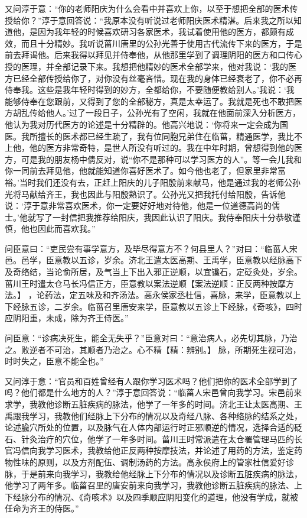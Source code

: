 \documentclass[12pt,UTF8]{ctexbook}
\begin{document}
又问淳于意：“你的老师阳庆为什么会看中并喜欢上你，以至于想把全部的医术传授给你？”淳于意回答说：“我原本没有听说过老师阳庆医术精湛。后来我之所以知道他，是因为我年轻的时候喜欢研习各家医术，我试着使用他的医方，都颇有成效，而且十分精妙。我听说菑川唐里的公孙光善于使用古代流传下来的医方，于是前去拜谒他。后来我得以拜见并侍奉他，从他那里学到了调理阴阳的医方和口传心授的医理，并全部记录下来。我想把他精妙的医术全部学来，他对我说：‘我的医方已经全部传授给你了，对你没有丝毫吝惜。现在我的身体已经衰老了，你不必再侍奉我。这些是我年轻时得到的妙方，全都给你，不要随便教给别人。’我说：‘我能够侍奉在您跟前，又得到了您的全部秘方，真是太幸运了。我就是死也不敢把医方胡乱传给他人。’过了一段日子，公孙光有了空闲，我就在他面前深入分析医方，他认为我对历代医方的论述是十分精辟的。他高兴地说：‘你将来一定会成为国医。我所擅长的医术都已经生疏了，我有位同胞兄弟住在临菑，精通医学，我比不上他，他的医方非常奇特，是世人所没有听过的。我在中年时期，曾想得到他的医方，可是我的朋友杨中倩反对，说“你不是那种可以学习医方的人”。等一会儿我和你一同前去拜见他，他就能知道你喜好医术了。如今他也老了，但家里非常富裕。’当时我们还没有去，正赶上阳庆的儿子阳殷前来献马，他是通过我的老师公孙光将马献给齐王，我也因此与阳殷熟识了。公孙光又把我托付给阳殷，告诉他说：‘淳于意非常喜欢医术，你一定要好好地对待他，他是一位道德高尚的儒士。’他就写了一封信把我推荐给阳庆，我因此认识了阳庆。我侍奉阳庆十分恭敬谨慎，他也因此而喜欢我。”

问臣意曰：“吏民尝有事学意方，及毕尽得意方不？何县里人？”对曰：“临菑人宋邑。邑学，臣意教以五诊，岁余。济北王遣太医高期、王禹学，臣意教以经脉高下及奇络结，当论俞所居，及气当上下出入邪正逆顺，以宜镵石，定砭灸处，岁余。菑川王时遣太仓马长冯信正方，臣意教以案法逆顺【案法逆顺：正反两种按摩方法。】 ，论药法，定五味及和齐汤法。高永侯家丞杜信，喜脉，来学，臣意教以上下经脉五诊，二岁余。临菑召里唐安来学，臣意教以五诊上下经脉，《奇咳》，四时应阴阳重，未成，除为齐王侍医。”

问臣意：“诊病决死生，能全无失乎？”臣意对曰：“意治病人，必先切其脉，乃治之。败逆者不可治，其顺者乃治之。心不精【精：辨别。】 脉，所期死生视可治，时时失之，臣意不能全也。”

又问淳于意：“官员和百姓曾经有人跟你学习医术吗？他们把你的医术全部学到了吗？他们都是什么地方的人？”淳于意回答说：“临菑人宋邑曾向我学习。宋邑前来求学，我教他诊断五脏疾病的脉法，他学了一年多的时间。济北王让太医高期、王禹跟我学习，我教他们经脉上下分布的情况以及奇经八脉、各种络脉的结系之处，论述腧穴所处的位置，以及脉气在人体内部运行时正邪顺逆的情况，选择合适的砭石、针灸治疗的穴位，他学了一年多时间。菑川王时常派遣在太仓署管理马匹的长官冯信向我学习医术，我教给他正反两种按摩技法，并论述了用药的方法，鉴定药物性味的原则，以及方剂配伍、调制汤药的方法。高永侯府上的管家杜信爱好诊脉，于是前来向我学习，我教给他经脉上下分布的情况以及诊断五脏疾病的脉法，他学习了两年多。临菑召里的唐安前来向我学习，我教他诊断五脏疾病的脉法、上下经脉分布的情况、《奇咳术》以及四季顺应阴阳变化的道理，他没有学成，就被任命为齐王的侍医。”
\end{document}
